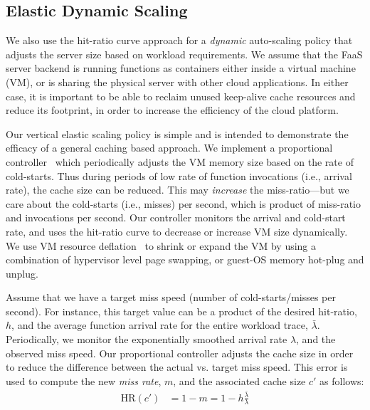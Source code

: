 

\subsection{Elastic Dynamic Scaling}
\label{subsec:dynamic}

We also use the hit-ratio curve approach for a \emph{dynamic} auto-scaling policy that adjusts the server size based on workload requirements. 
%
We assume that the FaaS server backend is running functions as containers either inside a virtual machine (VM), or is sharing the physical server with other cloud applications. 
In either case, it is important to be able to reclaim unused keep-alive cache resources and reduce its footprint, in order to increase the efficiency of the cloud platform. 

Our vertical elastic scaling policy is simple and is intended to demonstrate the efficacy of a general caching based approach. 
We implement a  proportional controller~\cite{pid-wiki} which periodically adjusts the VM memory size based on the rate of cold-starts.  
Thus during periods of low rate of function invocations (i.e., arrival rate), the cache size can be reduced. 
This may \emph{increase} the miss-ratio---but we care about the cold-starts (i.e., misses) per second, which is product of miss-ratio and invocations per second.
Our controller monitors the arrival and cold-start rate, and uses the hit-ratio curve to decrease or increase VM size dynamically. 
We use VM resource deflation~\cite{deflation-eurosys19} to shrink or expand the VM by using a combination of hypervisor level page swapping, or guest-OS memory hot-plug and unplug. 


Assume that we have a target miss speed (number of cold-starts/misses per second).
For instance, this target value can be a product of the desired hit-ratio, $h$, and the average function arrival rate for the entire workload trace, $\bar{\lambda}$. 
Periodically, we monitor the exponentially smoothed arrival rate $\lambda$, and the observed miss speed.
Our proportional controller adjusts the cache size in order to reduce the difference between the actual vs. target miss speed.
This error is used to compute the new \emph{miss rate}, $m$, and the associated cache size $c'$ as follows:
\begin{align}
  \label{eq:dyn}
  \text{HR}(c') & = 1-m = 1 - h\frac{\bar{\lambda}}{\lambda}
\end{align}

